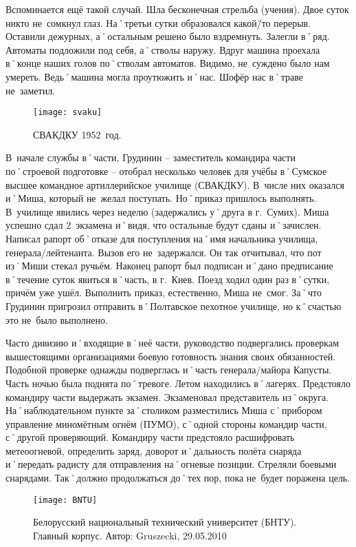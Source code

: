 Вспоминается ещё такой случай. Шла бесконечная стрельба (учения). Двое суток никто не~сомкнул глаз. На˚третьи сутки образовался какой\=/то перерыв. Оставили дежурных, а˚остальным решено было вздремнуть. Залегли в˚ряд. Автоматы подложили под себя, а˚стволы наружу. Вдруг машина проехала в˚конце наших голов по˚стволам автоматов. Видимо, не~суждено было нам умереть. Ведь˚машина могла проутюжить и˚нас. Шофёр нас в˚траве не~заметил.

\begin{wrapfigure}{O}{.4\textwidth}
\centering
\texttt{[image: svaku]}
\caption[СВАКДКУ 1952~год.]{СВАКДКУ 1952~год\footnotemark.}
\label{fig:svaku}
\end{wrapfigure}

В~начале службы в˚части, Грудинин \--- заместитель командира части по˚строевой подготовке \--- отобрал несколько человек для учёбы в˚Сумское высшее командное артиллерийское училище (СВАКДКУ). В~числе них оказался и˚Миша, который не~желал поступать. Но˚приказ пришлось выполнять. В~училище явились через неделю (задержались у˚друга в г.~Сумих). Миша успешно сдал 2~экзамена и˚видя, что остальные будут сданы и˚зачислен. Написал рапорт об˚отказе для поступления на˚имя начальника училища, генерала\-/лейтенанта. Вызов его не~задержался. Он так отчитывал, что пот из˚Миши стекал ручьём. Наконец рапорт был подписан и˚дано предписание в˚течение суток явиться в˚часть, в г.~Киев. Поезд ходил один раз в˚сутки, причём уже ушёл. Выполнить приказ, естественно, Миша не~смог. За˚что Грудинин пригрозил отправить в˚Полтавское пехотное училище, но к˚счастью это не~было выполнено. 

Часто дивизию и˚входящие в˚неё части, руководство подвергались проверкам вышестоящими организациями боевую готовность знания своих обязанностей. Подобной проверке однажды подверглась и˚часть генерала\-/майора Капусты. Часть ночью была поднята по˚тревоге. Летом находились в˚лагерях. Предстояло командиру части выдержать экзамен. Экзаменовал представитель из˚округа. На˚наблюдательном пункте за˚столиком разместились Миша с˚прибором управление миномётным огнём (ПУМО), с˚одной стороны командир части, с˚другой проверяющий. Командиру части предстояло расшифровать метеоогневой, определить заряд, доворот и˚дальность полёта снаряда и˚передать радисту для отправления на˚огневые позиции. Стреляли боевыми снарядами. Так˚должно продолжаться до˚тех пор, пока не~будет поражена цель. 

\begin{wrapfigure}{O}{.4\textwidth}
\centering
\texttt{[image: BNTU]}
\caption{Белорусский национальный технический университет (БНТУ). Главный корпус. Автор: Gruszecki, 29.05.2010}
\label{fig:BNTU}
\end{wrapfigure}

